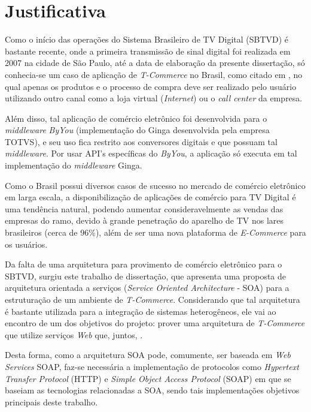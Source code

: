 \section{Justificativa} \label{sec:justificativa}

Como o início das operações do Sistema Brasileiro de TV Digital (SBTVD) é bastante recente, onde a primeira transmissão
de sinal digital foi realizada em 2007 na cidade de São Paulo, 
até a data de elaboração da presente dissertação, só conhecia-se 
um caso de aplicação de \textit{T-Commerce} no Brasil, como citado em \cite{extra-vendas-tvd},
no qual apenas  os produtos e o processo de compra deve ser realizado pelo usuário utilizando
outro canal como a loja virtual (\textit{Internet}) ou o \textit{call center} da empresa.

Além disso, tal aplicação de comércio eletrônico foi desenvolvida para 
o \textit{middleware} \textit{ByYou} (implementação do Ginga desenvolvida pela empresa TOTVS)\cite{totvs-byyou},
e seu uso fica restrito aos conversores digitais e  que possuam
tal \textit{middleware}. Por usar API's específicas do \textit{ByYou}, a aplicação só executa em tal implementação 
do \textit{middleware} Ginga.

Como o Brasil possui diversos casos de sucesso no mercado de comércio eletrônico em larga escala, 
a disponibilização de aplicações de comércio para TV Digital é uma tendência natural,
podendo aumentar consideravelmente as vendas das empresas do ramo, devido à grande penetração
do aparelho de TV nos lares brasileiros (cerca de 96\%)\cite{ibge-pnad}, além 
de ser uma nova plataforma de \textit{E-Commerce} para os usuários.

Da falta de uma arquitetura para provimento de comércio eletrônico para o SBTVD, surgiu este trabalho
de dissertação, que apresenta uma proposta de arquitetura orientada a serviços (\textit{Service Oriented Architecture} - SOA) para a estruturação
de um ambiente de \textit{T-Commerce}. Considerando que tal arquitetura é bastante
utilizada para a integração de sistemas heterogêneos, ele vai ao encontro de um dos objetivos
do projeto: prover uma arquitetura de \textit{T-Commerce} que utilize serviços \textit{Web}
que, juntos, 
.

Desta forma, como a arquitetura SOA pode, comumente, ser baseada em \textit{Web Services} SOAP, faz-se necessária
a implementação de protocolos como \textit{Hypertext Transfer Protocol} (HTTP) e 
\textit{Simple Object Access Protocol} (SOAP) em que se baseiam as tecnologias relacionadas a SOA,
sendo tais implementações objetivos principais deste trabalho.

